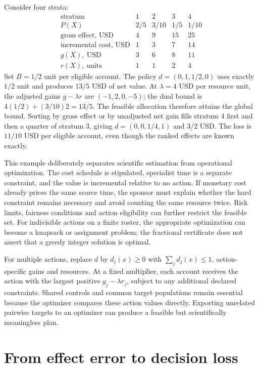 Consider four strata:
\[
\begin{array}{c|rrrr}
 \text{stratum}&1&2&3&4\\ \hline
 P(X)&2/5&3/10&1/5&1/10\\
 \text{gross effect, USD}&4&9&15&25\\
 \text{incremental cost, USD}&1&3&7&14\\
 g(X),\ \text{USD}&3&6&8&11\\
 r(X),\ \text{units}&1&1&2&4
\end{array}
\]
Set $B=1/2$ unit per eligible account. The policy
$d=(0,1,1/2,0)$ uses exactly $1/2$ unit and produces $13/5$ USD of net value.
At $\lambda=4$ USD per resource unit, the adjusted gains
$g-\lambda r$ are $(-1,2,0,-5)$; the dual bound is
$4(1/2)+(3/10)2=13/5$. The feasible allocation therefore attains the global
bound. Sorting by gross effect or by unadjusted net gain fills stratum 4
first and then a quarter of stratum 3, giving
$d=(0,0,1/4,1)$ and $3/2$ USD. The loss is $11/10$ USD per eligible
account, even though the ranked effects are known exactly.\citep{exec17_s4_math}

This example deliberately separates scientific estimation from operational
optimization. The cost schedule is stipulated, specialist time is a separate
constraint, and the value is incremental relative to no action. If monetary
cost already prices the same scarce time, the sponsor must explain whether
the hard constraint remains necessary and avoid counting the same resource
twice. Risk limits, fairness conditions and action eligibility can further
restrict the feasible set. For indivisible actions on a finite roster, the
appropriate optimization can become a knapsack or assignment problem; the
fractional certificate does not assert that a greedy integer solution is
optimal.

For multiple actions, replace $d$ by $d_j(x)\geq0$ with
$\sum_jd_j(x)\leq1$, action-specific gains and resources. At a fixed
multiplier, each account receives the action with the largest positive
$g_j-\lambda r_j$, subject to any additional declared constraints. Shared
controls and common target populations remain essential because the optimizer
compares these action values directly. Exporting unrelated pairwise targets
to an optimizer can produce a feasible but scientifically meaningless plan.

\section{From effect error to decision loss}
\label{exec17:s4-regret}

